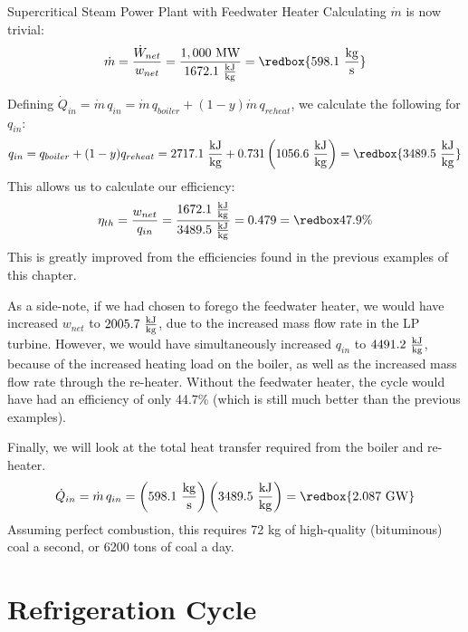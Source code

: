 \begin{example}[label=ex:ch4FeedwaterHeater]{Supercritical Steam Power Plant with Feedwater Heater}
   Calculating $\dot{m}$ is now trivial:
   \begin{equation*}
    \dot{m} = \frac{\dot{W}_{net}}{w_{net}} = \frac{1,000\ \rm MW}{1672.1\ \frac{\rm kJ}{\rm kg}} = \redbox{598.1\ \frac{\rm kg}{\rm s}}
   \end{equation*}

   Defining $\dot{Q}_{in} = \dot{m}\,q_{in} = \dot{m}\,q_{boiler}+(1-y)\dot{m}\,q_{reheat}$, we calculate the following for $q_{in}$:
   \begin{equation*}
     q_{in} = q_{boiler} + (1-y)q_{reheat} = 2717.1\ \frac{\rm kJ}{\rm kg} + 0.731 \left(1056.6\ \frac{\rm kJ}{\rm kg}\right) = \redbox{3489.5\ \frac{\rm kJ}{\rm kg}}
   \end{equation*}
   This allows us to calculate our efficiency:
   \begin{equation*}
     \eta_{th} = \frac{w_{net}}{q_{in}} = \frac{1672.1\ \frac{\rm kJ}{\rm kg}}{3489.5\ \frac{\rm kJ}{\rm kg}} = 0.479 = \redbox{47.9\%}
   \end{equation*}
   This is greatly improved from the efficiencies found in the previous examples of this chapter.

   As a side-note, if we had chosen to forego the feedwater heater, we would have increased $w_{net}$ to $2005.7\ \frac{\rm kJ}{\rm kg}$, due to the increased mass flow rate in the LP turbine. However, we would have simultaneously increased $q_{in}$ to $4491.2\ \frac{\rm kJ}{\rm kg}$, because of the increased heating load on the boiler, as well as the increased mass flow rate through the re-heater.  Without the feedwater heater, the cycle would have had an efficiency of only 44.7\% (which is still much better than the previous examples).

   Finally, we will look at the total heat transfer required from the boiler and re-heater.
   \begin{equation*}
     \dot{Q}_{in} = \dot{m}\, q_{in} = \left(598.1\ \frac{\rm kg}{\rm s}\right)\left(3489.5\ \frac{\rm kJ}{\rm kg}\right) = \redbox{2.087\ \rm GW}
   \end{equation*}
   Assuming perfect combustion, this requires 72 kg of high-quality (bituminous) coal a second, or 6200 tons of coal a day.
\end{example}

\section{Refrigeration Cycle} \label{sec:Refrigeration}

